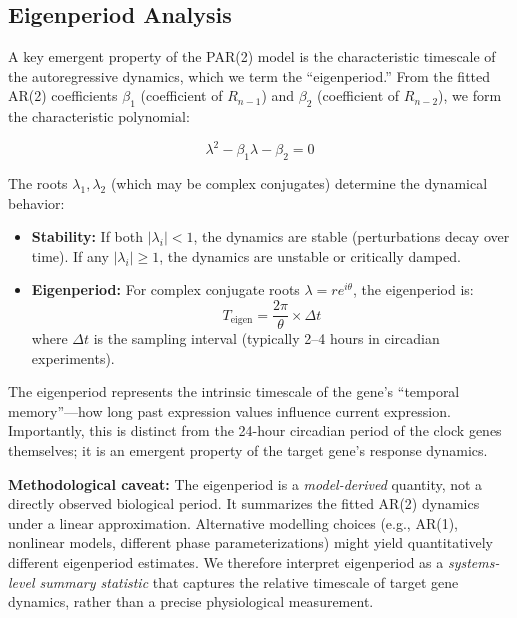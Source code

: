 \documentclass[11pt,a4paper]{article}
\begin{document}
\subsection{Eigenperiod Analysis}
\label{sec:eigenperiod}

A key emergent property of the PAR(2) model is the characteristic timescale of the autoregressive dynamics, which we term the ``eigenperiod.'' From the fitted AR(2) coefficients $\beta_1$ (coefficient of $R_{n-1}$) and $\beta_2$ (coefficient of $R_{n-2}$), we form the characteristic polynomial:

\begin{equation}
\lambda^2 - \beta_1\lambda - \beta_2 = 0
\end{equation}

The roots $\lambda_1, \lambda_2$ (which may be complex conjugates) determine the dynamical behavior:

\begin{itemize}
    \item \textbf{Stability:} If both $|\lambda_i| < 1$, the dynamics are stable (perturbations decay over time). If any $|\lambda_i| \geq 1$, the dynamics are unstable or critically damped.
    
    \item \textbf{Eigenperiod:} For complex conjugate roots $\lambda = re^{i\theta}$, the eigenperiod is:
    \begin{equation}
    T_{\text{eigen}} = \frac{2\pi}{\theta} \times \Delta t
    \end{equation}
    where $\Delta t$ is the sampling interval (typically 2--4 hours in circadian experiments).
\end{itemize}

The eigenperiod represents the intrinsic timescale of the gene's ``temporal memory''---how long past expression values influence current expression. Importantly, this is distinct from the 24-hour circadian period of the clock genes themselves; it is an emergent property of the target gene's response dynamics.

\textbf{Methodological caveat:} The eigenperiod is a \textit{model-derived} quantity, not a directly observed biological period. It summarizes the fitted AR(2) dynamics under a linear approximation. Alternative modelling choices (e.g., AR(1), nonlinear models, different phase parameterizations) might yield quantitatively different eigenperiod estimates. We therefore interpret eigenperiod as a \textit{systems-level summary statistic} that captures the relative timescale of target gene dynamics, rather than a precise physiological measurement.
\end{document}
